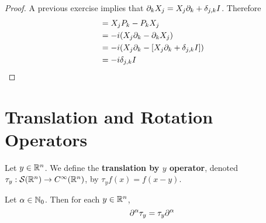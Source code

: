 \documentclass{book}
\begin{document}
	\begin{proof}
		A previous exercise implies that $\partial_k X_j = X_j \partial_k + \delta_{j,k}I$. Therefore
		\begin{align*}
			[X_j, P_k]
			& = X_j P_k - P_k X_j \\
			& = -i (X_j \p_k - \p_k X_j) \\
			& = -i (X_j \p_k - [X_j \p_k + \del_{j,k}I]) \\
			& = -i \del_{j,k}I
		\end{align*}
	\end{proof}









































	
	\newpage
	\section{Translation and Rotation Operators}
	
	\begin{defn} 
		Let $y \in \mathbb{R}^n$. We define the \textbf{translation by $y$ operator}, denoted $\tau_y: \mathcal{S}(\mathbb{R}^n) \rightarrow C^{\infty}(\mathbb{R}^n)$, by $\tau_yf(x) = f(x-y)$.
	\end{defn}

	\begin{ex} 
		Let $\alpha \in \mathbb{N}_0$.  Then for each $y \in \mathbb{R}^n$, 
		$$\partial^{\alpha}\tau_y = \tau_y \partial^{\alpha}$$
	\end{ex}
\end{document}
